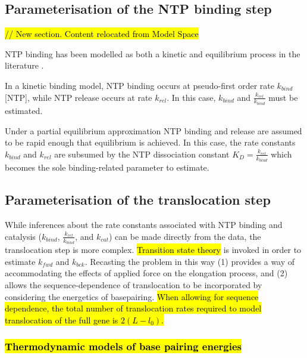 \documentclass[10pt,letterpaper]{article}
\begin{document}
\subsection*{Parameterisation of the NTP binding step}

\textcolor{red}{\hl{// New section. Content relocated from Model Space}}



NTP binding has been modelled as both a kinetic and equilibrium process in the literature \cite{bai2004sequence, abbondanzieri2005direct, maoileidigh2011unified}.

In a kinetic binding model, NTP binding occurs at pseudo-first order rate $k_{bind}$[NTP], while NTP release occurs at rate $k_{rel}$. In this case, $k_{bind}$ and $\frac{k_{rel}}{k_{bind}}$ must be estimated.

Under a partial equilibrium approximation NTP binding and release are assumed to be rapid enough that equilibrium is achieved. In this case, the rate constants $k_{bind}$ and $k_{rel}$ are subsumed by the NTP dissociation constant $K_D = \frac{k_{rel}}{k_{bind}}$ which becomes the sole binding-related parameter to estimate.



\subsection*{Parameterisation of the translocation step}





While inferences about the rate constants associated with NTP binding and catalysis ($k_{bind}$, $\frac{k_{rel}}{k_{bind}}$, and $k_{cat}$) can be made directly from the data, the translocation step is more complex. \hl{Transition state theory} is invoked in order to estimate $k_{fwd}$ and $k_{bck}$. Recasting the problem in this way (1) provides a way of accommodating the effects of applied force on the elongation process, and (2) allows the sequence-dependence of translocation to be incorporated by considering the energetics of basepairing. \hl{When allowing for sequence dependence, the total number of translocation rates required to model translocation of the full gene is $2(L - l_0)$.}




\subsubsection*{\hl{Thermodynamic models of base pairing energies}}
\end{document}
